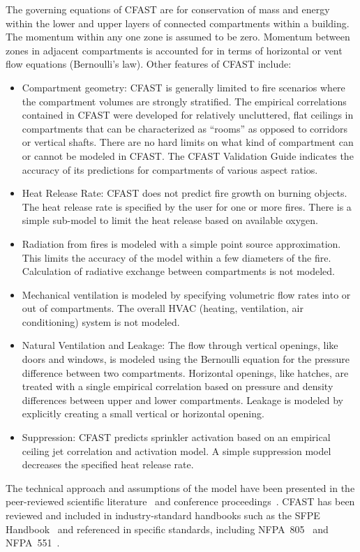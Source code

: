 \documentclass[11pt]{book}
\begin{document}
The governing equations of CFAST are for conservation of mass and energy within the lower and upper layers of connected compartments within a building. The momentum within any one zone is assumed to be zero.  Momentum between zones in adjacent compartments is accounted for in terms of horizontal or vent flow equations (Bernoulli's law). Other features of CFAST include:
\begin{itemize}
\item Compartment geometry: CFAST is generally limited to fire scenarios where the compartment volumes are strongly stratified. The empirical correlations contained in CFAST were developed for relatively uncluttered, flat ceilings in compartments that can be characterized as ``rooms'' as opposed to corridors or vertical shafts. There are no hard limits on what kind of compartment can or cannot be modeled in CFAST. The CFAST Validation Guide indicates the accuracy of its predictions for compartments of various aspect ratios.
\item Heat Release Rate: CFAST does not predict fire growth on burning objects. The heat release rate is specified by the user for one or more fires. There is a simple sub-model to limit the heat release based on available oxygen.
\item Radiation from fires is modeled with a simple point source approximation.  This limits the accuracy of the model within a few diameters of the fire. Calculation of radiative exchange between compartments is not modeled.
\item Mechanical ventilation is modeled by specifying volumetric flow rates into or out of compartments. The overall HVAC (heating, ventilation, air conditioning) system is not modeled.
\item Natural Ventilation and Leakage: The flow through vertical openings, like doors and windows, is modeled using the Bernoulli equation for the pressure difference between two compartments. Horizontal openings, like hatches, are treated with a single empirical correlation based on pressure and density differences between upper and lower compartments. Leakage is modeled by explicitly creating a small vertical or horizontal opening.
\item Suppression: CFAST predicts sprinkler activation based on an empirical ceiling jet correlation and activation model. A simple suppression model decreases the specified heat release rate.
\end{itemize}

The technical approach and assumptions of the model have been presented in the peer-reviewed scientific literature~\cite{Jones:1993a, Jones:1985, Jones:1984} and conference proceedings~\cite{Jones:1991}. CFAST has been reviewed and included in industry-standard handbooks such as the SFPE Handbook~\cite{Walton:2003} and referenced in specific standards, including NFPA~805~\cite{NFPA805:2004} and NFPA~551~\cite{NFPA551:2004}.
\end{document}
